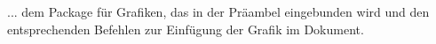 
... dem Package für Grafiken, das in der Präambel eingebunden wird und den entsprechenden Befehlen zur Einfügung der Grafik im Dokument.
